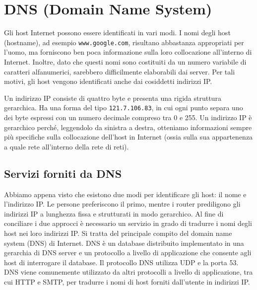 \section{DNS (Domain Name System)}
Gli host Internet possono essere identificati in vari modi. I nomi degli host (hostname), ad esempio \verb|www.google.com|, risultano abbastanza appropriati per l'uomo, ma forniscono ben poca informazione sulla loro collocazione all'interno di Internet. Inoltre, dato che questi nomi sono costituiti da un numero variabile di caratteri alfanumerici, sarebbero difficilmente elaborabili dai server. Per tali motivi, gli host vengono identificati anche dai cosiddetti indirizzi IP.

Un indirizzo IP consiste di quattro byte e presenta una rigida struttura gerarchica. Ha una forma del tipo \verb|121.7.106.83|, in cui ogni punto separa uno dei byte espressi con un numero decimale compreso tra 0 e 255. Un indirizzo IP è gerarchico perché, leggendolo da sinistra a destra, otteniamo informazioni sempre più specifiche sulla collocazione dell'host in Internet (ossia sulla sua appartenenza a quale rete all'interno della rete di reti).

\subsection{Servizi forniti da DNS}
Abbiamo appena visto che esistono due modi per identificare gli host: il nome e l'indirizzo IP. Le persone preferiscono il primo, mentre i router prediligono gli indirizzi IP a lunghezza fissa e strutturati in modo gerarchico. Al fine di conciliare i due approcci è necessario un servizio in grado di tradurre i nomi degli host nei loro indirizzi IP. Si tratta del principale compito del domain name system (DNS) di Internet. DNS è un database distribuito implementato in una gerarchia di DNS server e un protocollo a livello di applicazione che consente agli host di interrogare il database. Il protocollo DNS utilizza UDP e la porta 53. DNS viene comunemente utilizzato da altri protocolli a livello di applicazione, tra cui HTTP e SMTP, per tradurre i nomi di host forniti dall'utente in indirizzi IP.

